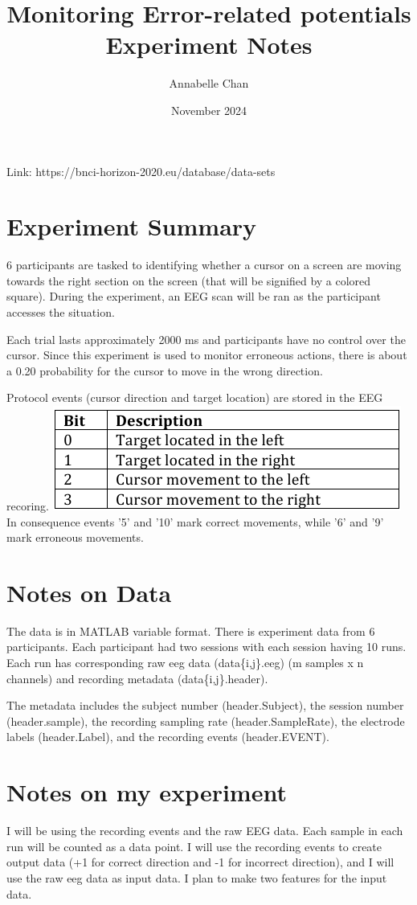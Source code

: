 \documentclass[12pt]{article}
\title{Monitoring Error-related potentials Experiment Notes}
\author{Annabelle Chan}
\date{November 2024}
\begin{document}
\maketitle
Link: https://bnci-horizon-2020.eu/database/data-sets\newline
\section{Experiment Summary}
6 participants are tasked to identifying whether a cursor on a screen are moving towards the right section on the screen (that will be signified by a colored square). During the experiment, an EEG scan will be ran as the participant accesses the situation.

Each trial lasts approximately 2000 ms and participants have no control over the cursor. Since this experiment is used to monitor erroneous actions, there is about a 0.20 probability for the cursor to move in the wrong direction.

Protocol events (cursor direction and target location) are stored in the EEG recoring. 
\includegraphics[scale=1]{ProtocolEventTable}
In consequence events '5' and '10' mark correct movements, while '6' and '9' mark erroneous movements.

\section{Notes on Data}
The data is in MATLAB variable format. There is experiment data from 6 participants. Each participant had two sessions with each session having 10 runs. Each run has corresponding raw eeg data (data\{i,j\}.eeg) (m samples x n channels) and recording metadata (data\{i,j\}.header). 

The metadata includes the subject number (header.Subject), the session number (header.sample), the recording sampling rate (header.SampleRate), the electrode labels (header.Label), and the recording events (header.EVENT).

\section{Notes on my experiment}
I will be using the recording events and the raw EEG data. Each sample in each run will be counted as a data point. I will use the recording events to create output data (+1 for correct direction and -1 for incorrect direction), and I will use the raw eeg data as input data. I plan to make two features for the input data.
\end{document}
